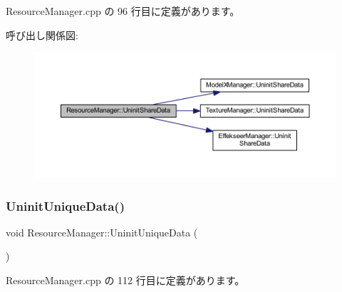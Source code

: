  Resource\+Manager.\+cpp の 96 行目に定義があります。

呼び出し関係図\+:
\nopagebreak
\begin{figure}[H]
\begin{center}
\leavevmode
\includegraphics[width=350pt]{class_resource_manager_a786915d9c4df5a023a43db8c5332cb93_cgraph}
\end{center}
\end{figure}
\mbox{\label{class_resource_manager_abcb135906cb991a49ec6e8c8db057de1}} 
\subsubsection{\texorpdfstring{Uninit\+Unique\+Data()}{UninitUniqueData()}}
{\footnotesize\ttfamily void Resource\+Manager\+::\+Uninit\+Unique\+Data (\begin{DoxyParamCaption}{ }\end{DoxyParamCaption})\hspace{0.3cm}{\ttfamily [static]}}



 Resource\+Manager.\+cpp の 112 行目に定義があります。

